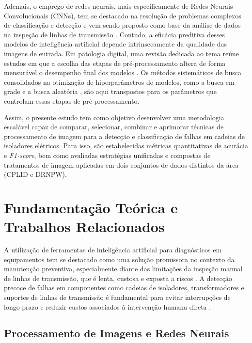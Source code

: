 \documentclass[conference]{IEEEtran}
\begin{document}
Ademais, o emprego de redes neurais, mais especificamente de Redes Neurais Convolucionais (CNNs), tem se destacado na resolução de problemas complexos de classificação e detecção \cite{LeCun2015, Krizhevsky2012} e vem sendo proposto como base da análise de dados na inspeção de linhas de transmissão \cite{nguyen2018automatic}. Contudo, a eficácia preditiva desses modelos de inteligência artificial depende intrinsecamente da qualidade das imagens de entrada. Em patologia digital, uma revisão dedicada ao tema reúne estudos em que a escolha das etapas de pré-processamento altera de forma mensurável o desempenho final dos modelos \cite{Salvi2021}. Os métodos sistemáticos de busca consolidados na otimização de hiperparâmetros de modelos, como a busca em grade e a busca aleatória \cite{yang2020hyperparameter}, são aqui transpostos para os parâmetros que controlam essas etapas de pré-processamento.

Assim, o presente estudo tem como objetivo desenvolver uma metodologia escalável capaz de comparar, selecionar, combinar e aprimorar técnicas de processamento de imagem para a detecção e classificação de falhas em cadeias de isoladores elétricos. Para isso, são estabelecidas métricas quantitativas de acurácia e \textit{F1-score}, bem como avaliadas estratégias unificadas e compostas de tratamentos de imagem aplicadas em dois conjuntos de dados distintos da área (CPLID e DRNPW).

\section{Fundamentação Teórica e Trabalhos Relacionados}

A utilização de ferramentas de inteligência artificial para diagnósticos em equipamentos tem se destacado como uma solução promissora no contexto da manutenção preventiva, especialmente diante das limitações da inspeção manual de linhas de transmissão, que é lenta, custosa e exposta a riscos \cite{nguyen2018automatic}. A detecção precoce de falhas em componentes como cadeias de isoladores, transformadores e suportes de linhas de transmissão é fundamental para evitar interrupções de longo prazo \cite{nguyen2018automatic} e reduzir custos associados à intervenção humana direta \cite{maduako2022deep}.

\subsection{Processamento de Imagens e Redes Neurais}
\end{document}
